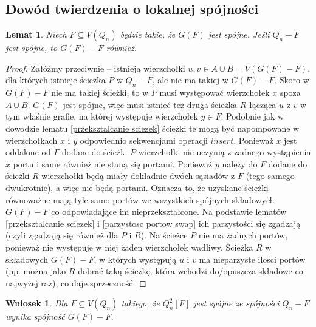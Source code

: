 \documentclass{pracamgr}
\newtheorem{lemma}[theorem]{Lemat}
\newtheorem{corollary}[theorem]{Wniosek}
\begin{document}
   \subsection{Dowód twierdzenia o lokalnej spójności}
    \begin{lemma}\label{Q_n-F spojne => G(F)-F spojne (1 skladowa)}
     Niech $F\subseteq V(Q_n)$ będzie takie, że $G(F)$ jest spójne. Jeśli $Q_n-F$ jest spójne, to $G(F)-F$ również.
    \end{lemma}
    \begin{proof}
     Załóżmy przeciwnie -- istnieją wierzchołki $u,v\in A\cup B=V(G(F)-F)$, dla których istnieje ścieżka $P$ w $Q_n-F$, ale nie ma takiej w  $G(F)-F$.
     Skoro w $G(F)-F$ nie ma takiej ścieżki, to w $P$ musi występować wierzchołek $x$ spoza $A\cup B$.\newline
     $G(F)$ jest spójne, więc musi istnieć też druga ścieżka $R$ łącząca $u$ z $v$ w tym właśnie grafie, na której występuje wierzchołek $y\in F$.\newline
     Podobnie jak w dowodzie lematu \ref{przeksztalcanie sciezek} 
     ścieżki te mogą być napompowane w wierzchołkach $x$ i $y$ odpowiednio sekwencjami operacji $insert$.\newline
     Ponieważ $x$ jest oddalone od $F$ dodane do ścieżki $P$ wierzchołki nie uczynią z żadnego wystąpienia $x$ portu i same również nie staną się portami.
     Ponieważ $y$ należy do $F$ dodane do ścieżki $R$ wierzchołki będą miały dokładnie dwóch sąsiadów z $F$ (tego samego dwukrotnie), a więc nie będą portami.\newline
     Oznacza to, że uzyskane ścieżki równoważne mają tyle samo portów we wszystkich spójnych składowych $G(F)-F$ co odpowiadające im nieprzekształcone.
     Na podstawie lematów \ref{przeksztalcanie sciezek} i \ref{parzystosc portow swap} ich parzystości  się zgadzają (czyli zgadzają się również dla $P$ i $R$).
     Na ścieżce $P$ nie ma żadnych portów, ponieważ nie występuje w niej żaden wierzchołek wadliwy.
     Ścieżka $R$ w składowych $G(F)-F$, w których występują $u$ i $v$ ma nieparzyste ilości portów
     (np. można jako $R$ dobrać taką ścieżkę, która wchodzi do/opuszcza składowe co najwyżej raz), co daje sprzeczność.
    \end{proof}
    \begin{corollary}\label{Q_n-F spojne => Q_n^2[F]-F spojne (1 skladowa)}
     Dla $F\subseteq V(Q_n)$ takiego, że $Q_n^2[F]$ jest spójne ze spójności $Q_n-F$ wynika spójność $G(F)-F$.
    \end{corollary}
\end{document}
